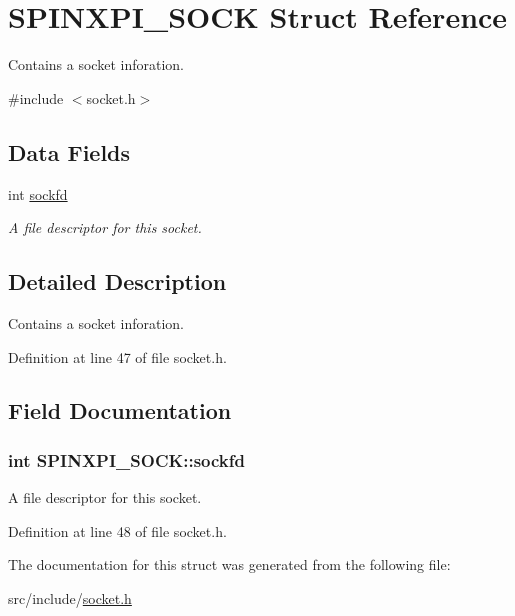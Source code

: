 \hypertarget{structSPINXPI__SOCK}{\section{S\-P\-I\-N\-X\-P\-I\-\_\-\-S\-O\-C\-K Struct Reference}
\label{structSPINXPI__SOCK}
}


Contains a socket inforation.  




{\ttfamily \#include $<$socket.\-h$>$}

\subsection*{Data Fields}
\begin{DoxyCompactItemize}
\item 
int \hyperlink{structSPINXPI__SOCK_a198711f03b31988d9192f5d870f93ecb}{sockfd}
\begin{DoxyCompactList}\small\item\em A file descriptor for this socket. \end{DoxyCompactList}\end{DoxyCompactItemize}


\subsection{Detailed Description}
Contains a socket inforation. 

Definition at line 47 of file socket.\-h.



\subsection{Field Documentation}
\hypertarget{structSPINXPI__SOCK_a198711f03b31988d9192f5d870f93ecb}{
\subsubsection[{sockfd}]{\setlength{\rightskip}{0pt plus 5cm}int S\-P\-I\-N\-X\-P\-I\-\_\-\-S\-O\-C\-K\-::sockfd}}\label{structSPINXPI__SOCK_a198711f03b31988d9192f5d870f93ecb}


A file descriptor for this socket. 



Definition at line 48 of file socket.\-h.



The documentation for this struct was generated from the following file\-:\begin{DoxyCompactItemize}
\item 
src/include/\hyperlink{socket_8h}{socket.\-h}\end{DoxyCompactItemize}
